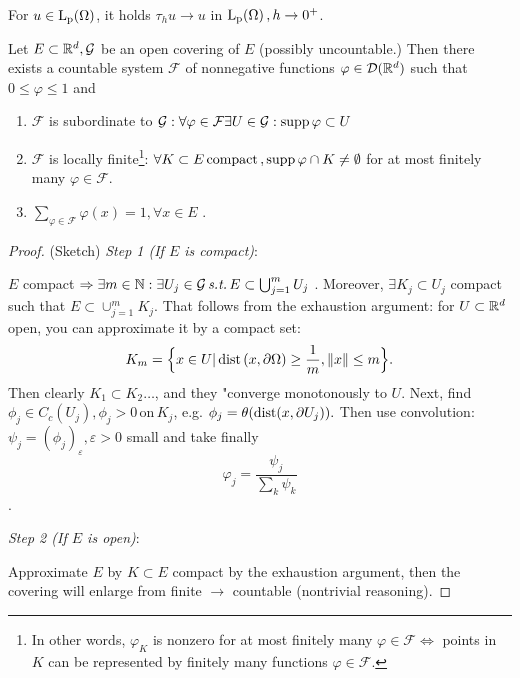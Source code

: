 \documentclass{article}
\begin{document}
\begin{lemma}
	For $u \in \LpSet{\Omega}$, it holds $\tau_h u \to u$ in $\LpSet{\Omega}, h\to 0^+$.
\end{lemma}

\begin{lemma}
	Let $E \subset {\mathbb R}^d, \mathcal{G}$ be an open covering of $E$ (possibly uncountable.) Then there exists a countable system $\mathcal{F}$ of nonnegative functions $\varphi \in \mathcal{D}({\mathbb R}^d)$ such that $0 \leq \varphi \leq 1$ and 
	\begin{enumerate}
		\item $\mathcal{F}$ is subordinate to $\mathcal{G}: \forall \varphi \in \mathcal{F} \exists U \in \mathcal{G}: \operatorname{supp} \varphi \subset U$
		\item $\mathcal{F}$ is locally finite\footnote{In other words, $\varphi_K$ is nonzero for at most finitely many $\varphi \in \mathcal{F} \Leftrightarrow$ points in $K$ can be represented by finitely many functions $\varphi \in \mathcal{F}.$}: $\forall K \subset E \, \text{compact} \,, \operatorname{supp} \varphi \cap K \neq \emptyset$ for at most finitely many $\varphi \in \mathcal{F}$.
		\item $\sum_{\varphi \in \mathcal{F}} \varphi(x) = 1, \forall x \in E$ .
	\end{enumerate}
\end{lemma}
\begin{proof}
	(Sketch)
	\textit{Step 1 (If $E$ is compact)}:

	$E$ compact $\Rightarrow \exists m \in {\mathbb N}: \exists U_j \in \mathcal{G} \, \text{\textit{s.t.}} \, E \subset \bigcup_{j=1}^{m}U_j$ . Moreover, $\exists K_j \subset U_j$ compact such that $E \subset \cup_{j=1}^m K_j$. That follows from the exhaustion argument: for $U \subset {\mathbb R}^d$ open, you can approximate it by a compact set:
	\[
		K_m = \Big\{x \in U| \operatorname{dist}\qty(x,\partial \Omega) \geq \frac{1}{m}, \norm{x} \leq m \Big\}.
	\]
	Then clearly $K_1 \subset K_2 \dots $, and they "converge monotonously to $U$.
	Next, find $\phi_j \in C_c(U_j), \phi_j >0 \, \text{on} \, K_j$, e.g. $\phi_j = \theta\qty(\operatorname{dist}(x,\partial U_j)).$ Then use convolution: $\psi_j = (\phi_j)_{\varepsilon}, \varepsilon > 0$ small and take finally
	\[
		\varphi_j = \frac{\psi_j}{\sum_k \psi_k}
	\]
	.

	\textit{Step 2 (If $E$ is open)}:

	Approximate $E$ by $K \subset E$ compact by the exhaustion argument, then the covering will enlarge from finite $\to$ countable (nontrivial reasoning).
\end{proof}
\end{document}
